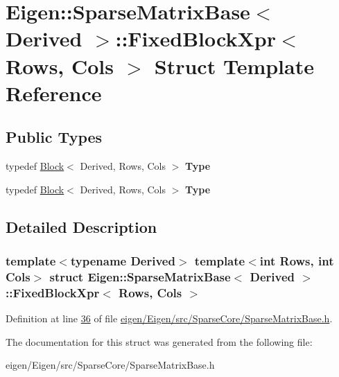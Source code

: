 \hypertarget{struct_eigen_1_1_sparse_matrix_base_1_1_fixed_block_xpr}{}\section{Eigen\+:\+:Sparse\+Matrix\+Base$<$ Derived $>$\+:\+:Fixed\+Block\+Xpr$<$ Rows, Cols $>$ Struct Template Reference}
\label{struct_eigen_1_1_sparse_matrix_base_1_1_fixed_block_xpr}
\subsection*{Public Types}
\begin{DoxyCompactItemize}
\item 
\mbox{\label{struct_eigen_1_1_sparse_matrix_base_1_1_fixed_block_xpr_a8350139935543855be363b2956ca4286}} 
typedef \hyperlink{group___core___module_class_eigen_1_1_block}{Block}$<$ Derived, Rows, Cols $>$ {\bfseries Type}
\item 
\mbox{\label{struct_eigen_1_1_sparse_matrix_base_1_1_fixed_block_xpr_a8350139935543855be363b2956ca4286}} 
typedef \hyperlink{group___core___module_class_eigen_1_1_block}{Block}$<$ Derived, Rows, Cols $>$ {\bfseries Type}
\end{DoxyCompactItemize}


\subsection{Detailed Description}
\subsubsection*{template$<$typename Derived$>$\newline
template$<$int Rows, int Cols$>$\newline
struct Eigen\+::\+Sparse\+Matrix\+Base$<$ Derived $>$\+::\+Fixed\+Block\+Xpr$<$ Rows, Cols $>$}



Definition at line \hyperlink{eigen_2_eigen_2src_2_sparse_core_2_sparse_matrix_base_8h_source_l00036}{36} of file \hyperlink{eigen_2_eigen_2src_2_sparse_core_2_sparse_matrix_base_8h_source}{eigen/\+Eigen/src/\+Sparse\+Core/\+Sparse\+Matrix\+Base.\+h}.



The documentation for this struct was generated from the following file\+:\begin{DoxyCompactItemize}
\item 
eigen/\+Eigen/src/\+Sparse\+Core/\+Sparse\+Matrix\+Base.\+h\end{DoxyCompactItemize}
